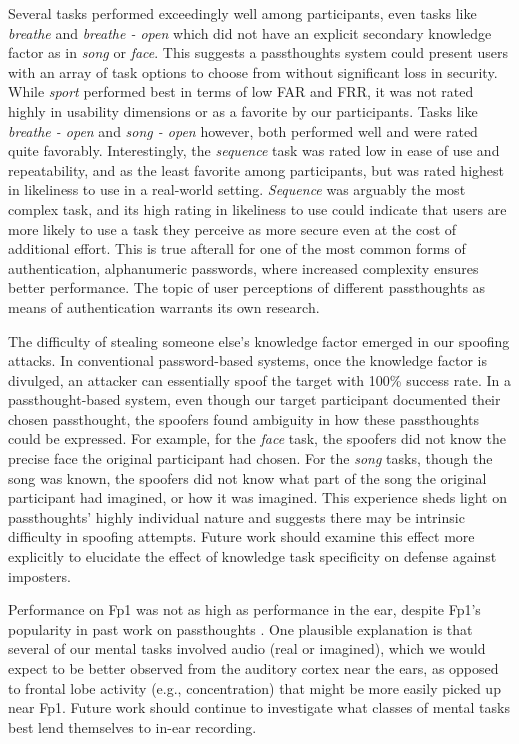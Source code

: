 \documentclass[a4paper,twoside]{article}
\begin{document}
Several tasks performed exceedingly well among participants, even tasks like \textit{breathe} and \textit{breathe - open} which did not have an explicit secondary knowledge factor as in \textit{song} or \textit{face}. This suggests a passthoughts system could present users with an array of task options to choose from without significant loss in security. While \textit{sport} performed best in terms of low FAR and FRR, it was not rated highly in usability dimensions or as a favorite by our participants. Tasks like \textit{breathe - open} and \textit{song - open} however, both performed well and were rated quite favorably. Interestingly, the \textit{sequence} task was rated low in ease of use and repeatability, and as the least favorite among participants, but was rated highest in likeliness to use in a real-world setting. \textit{Sequence} was arguably the most complex task, and its high rating in likeliness to use could indicate that users are more likely to use a task they perceive as more secure even at the cost of additional effort. This is true afterall for one of the most common forms of authentication, alphanumeric passwords, where increased complexity ensures better performance. The topic of user perceptions of different passthoughts as means of authentication warrants its own research.

The difficulty of stealing someone else's knowledge factor emerged in our spoofing attacks. In conventional password-based systems, once the knowledge factor is divulged, an attacker can essentially spoof the target with 100\% success rate. In a passthought-based system, even though 
our target participant documented their chosen passthought, the spoofers found ambiguity in how these passthoughts could be expressed. For example, for the \textit{face} task, the spoofers did not know the precise face the original participant had chosen. For the \textit{song} tasks, though the song was known, the spoofers did not know what part of the song the original participant had imagined, or how it was imagined. This experience sheds light on passthoughts' highly individual nature and suggests there may be intrinsic difficulty in spoofing attempts. Future work should examine this effect more explicitly to elucidate the effect of knowledge task specificity on defense against imposters.

Performance on Fp1 was not as high as performance in the ear, despite Fp1's popularity in past work on passthoughts \cite{Chuang2013b}. One plausible explanation is that several of our mental tasks involved audio (real or imagined), which we would expect to be better observed from the auditory cortex near the ears, as opposed to frontal lobe activity (e.g., concentration) that might be more easily picked up near Fp1. Future work should continue to investigate what classes of mental tasks best lend themselves to in-ear recording.
\end{document}
